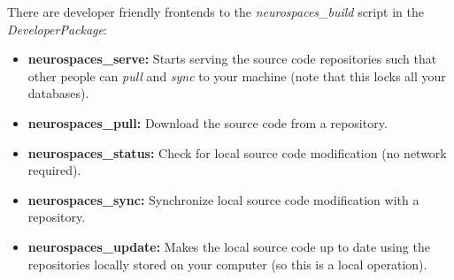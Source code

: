 \documentclass[12pt]{article}
\begin{document}


There are developer friendly frontends to the {\it neurospaces\_build} script in the {\it DeveloperPackage}:
\begin{itemize}
\item {\bf neurospaces\_serve:} Starts serving the source code repositories such that other people can {\it pull} and {\it sync} to your machine (note that this locks all your databases).
\item {\bf neurospaces\_pull:} Download the source code from a repository.
\item {\bf neurospaces\_status:} Check for local source code modification (no network required).
\item {\bf neurospaces\_sync:} Synchronize local source code modification with a repository.
\item {\bf neurospaces\_update:} Makes the local source code up to date using the repositories locally stored on your computer (so this is a local operation). 
\end{itemize}



\end{document}

